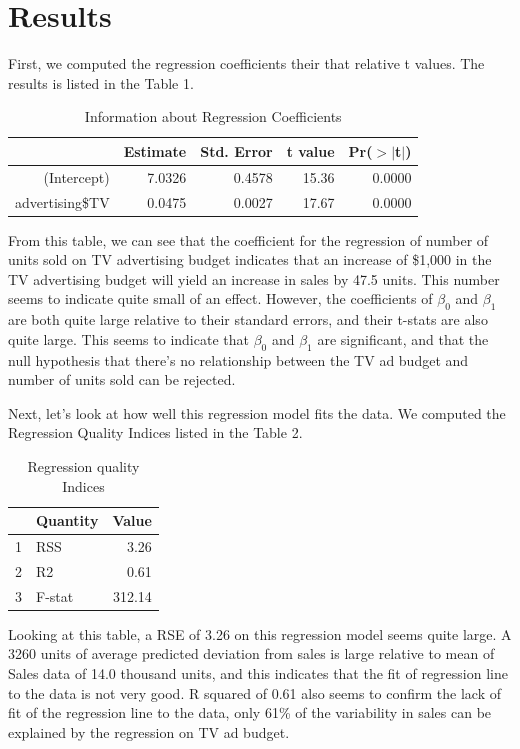 \documentclass{article}
\begin{document}
\section{Results}

First, we computed the regression coefficients their that relative t values. The results is listed in the Table 1.
\begin{table}[ht]
\centering
\begin{tabular}{rrrrr}
  \hline
 & Estimate & Std. Error & t value & Pr($>$$|$t$|$) \\ 
  \hline
(Intercept) & 7.0326 & 0.4578 & 15.36 & 0.0000 \\ 
  advertising\$TV & 0.0475 & 0.0027 & 17.67 & 0.0000 \\ 
   \hline
\end{tabular}
\caption{Information about Regression Coefficients} 
\end{table}From this table, we can see that the coefficient for the regression of number of units sold on TV advertising budget indicates that an increase of \$1,000 in the TV advertising budget will yield an increase in sales by 47.5 units. This number seems to indicate quite small of an effect. However, the coefficients of $\beta_0$ and $\beta_1$ are both quite large relative to their standard errors, and their t-stats are also quite large. This seems to indicate that $\beta_0$ and $\beta_1$ are significant, and that the null hypothesis that there's no relationship between the TV ad budget and number of units sold can be rejected.

Next, let's look at how well this regression model fits the data. We computed the Regression Quality Indices listed in the Table 2.
\begin{table}[ht]
\centering
\begin{tabular}{rlr}
  \hline
 & Quantity & Value \\ 
  \hline
1 & RSS & 3.26 \\ 
  2 & R2 & 0.61 \\ 
  3 & F-stat & 312.14 \\ 
   \hline
\end{tabular}
\caption{Regression quality Indices} 
\end{table}Looking at this table, a RSE of 3.26 on this regression model seems quite large. A 3260 units of average predicted deviation from sales is large relative to mean of Sales data of 14.0 thousand units, and this indicates that the fit of regression line to the data is not very good. R squared of 0.61 also seems to confirm the lack of fit of the regression line to the data, only 61\% of the variability in sales can be explained by the regression on TV ad budget.
\end{document}
